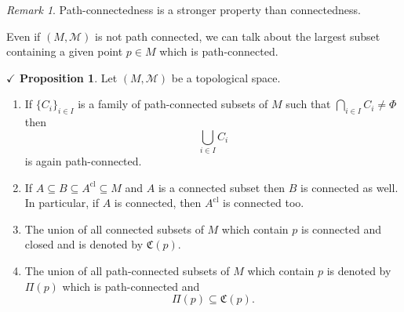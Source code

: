 \documentclass{article}
\theoremstyle{definition}
\theoremstyle{remark}
\newtheorem*{remark}{Remark}
\theoremstyle{definition}
\theoremstyle{definition}
\newtheorem{proposition}{$\checkmark$ Proposition}
\newcommand{\topo}[1]{\mathcal{#1}}
\newcommand{\closure}[1]{#1^{\text{cl}}}
\newcommand{\conncomp}[1]{\mathfrak{C}(#1)}
\newcommand{\pathconncomp}[1]{\Pi(#1)}
\begin{document}
\begin{remark}
	Path-connectedness is a stronger property than connectedness.
\end{remark}
\hrulefill
Even if $ (M,\topo{M}) $ is not path connected, we can talk about the largest subset containing a given point $ p\in M $ which is path-connected.
\hrulefill
\begin{proposition}
	Let $ (M,\topo{M}) $ be a topological space.
	\begin{enumerate}
		\item{If $ \{C_i\}_{i\in I} $ is a family of path-connected subsets of $ M $ such that $ \bigcap_{i\in I} C_i \neq \Phi $ then
	\[\bigcup_{i\in I} C_i\]	
is again path-connected.	
}
\item{If $ A\subseteq B \subseteq \closure{A} \subseteq M $ and $ A $ is a connected subset then $ B $ is connected as well. In particular, if $ A $ is connected, then $ \closure{A} $ is connected too.}
\item{The union of all connected subsets of $ M $ which contain $ p $ is connected and closed and is denoted by $ \conncomp{p} $.}
\item{The union of all path-connected subsets of $ M $ which contain $ p $ is denoted by $ \pathconncomp{p} $ which is path-connected and 
\[\pathconncomp{p} \subseteq \conncomp{p}.\]
}
	\end{enumerate}
\end{proposition}
\end{document}
